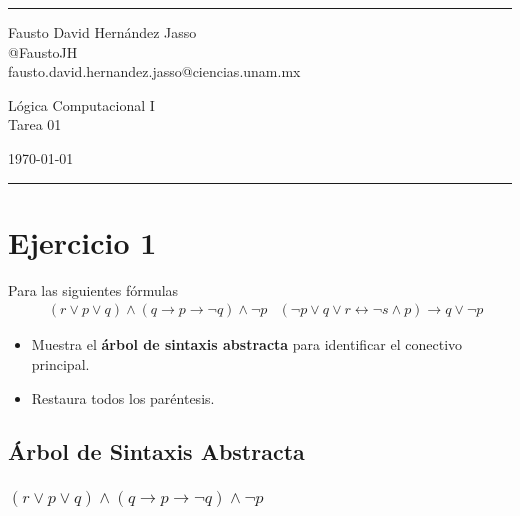 \documentclass[a4paper]{article}
\begin{document}

\fancyhead[C]{}
\hrule \medskip %
\begin{minipage}{0.295\textwidth} 
\raggedright
\footnotesize
Fausto David Hernández Jasso \hfill\\   
@FaustoJH \hfill\\
fausto.david.hernandez.jasso@ciencias.unam.mx
\end{minipage}
\begin{minipage}{0.4\textwidth} 
\centering 
\large 
Lógica Computacional I\\ 
\normalsize 
Tarea 01\\ 
\end{minipage}
\begin{minipage}{0.295\textwidth} 
\raggedleft
\today\hfill\\
\end{minipage}
\medskip\hrule 
\bigskip
\section{Ejercicio 1}
\noindent
Para las siguientes fórmulas
\begin{align*}
    & \left(r \lor p \lor q\right) \land \left(q \rightarrow p \rightarrow \neg q\right) \land \neg p
    & \left(\neg p \lor q \lor r \leftrightarrow \neg s \land p\right) \rightarrow q \lor \neg p
\end{align*}
\begin{itemize}
    \item Muestra el \textbf{árbol de sintaxis abstracta} para identificar el conectivo principal.
    \item Restaura todos los paréntesis.
\end{itemize}
\subsection{Árbol de Sintaxis Abstracta}
\subsubsection{\(\left(r \lor p \lor q\right) \land \left(q \rightarrow p \rightarrow \neg q\right) \land \neg p\)}
\end{document}
